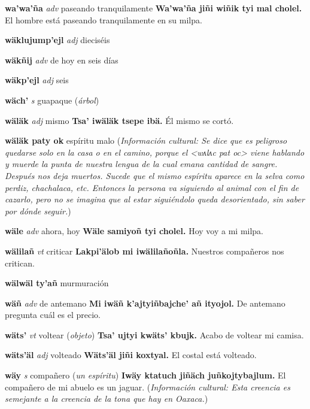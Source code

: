 \documentclass[10pt]{scrbook}
\newcommand{\entry}[1]{\textbf{#1}}
\newcommand{\partofspeech}[1]{\textit{#1}}
\newcommand{\spanishtranslation}[1]{#1}
\newcommand{\clarification}[1]{(\textit{#1})}
\newcommand{\cholexample}[1]{\textbf{#1}}
\newcommand{\exampletranslation}[1]{#1}
\newcommand{\culturalinformation}[1]{(\textit{#1})}
\begin{document}
\begin{multicols}{2}
\entry{wa'wa'ña}
\partofspeech{adv}
\spanishtranslation{paseando tranquilamente}
\cholexample{Wa'wa'ña jiñi wiñik tyi mal cholel.}
\exampletranslation{El hombre está paseando tranquilamente en su milpa.}

\entry{wäklujump'ejl}
\partofspeech{adj}
\spanishtranslation{dieciséis}

\entry{wäkñij}
\partofspeech{adv}
\spanishtranslation{de hoy en seis días}

\entry{wäkp'ejl}
\partofspeech{adj}
\spanishtranslation{seis}

\entry{wäch'}
\partofspeech{s}
\spanishtranslation{guapaque}
\clarification{árbol}

\entry{wäläk}
\partofspeech{adj}
\spanishtranslation{mismo}
\cholexample{Tsa' iwäläk tsepe ibä.}
\exampletranslation{Él mismo se cortó.}

\entry{wäläk paty ok}
\spanishtranslation{espíritu malo}
\culturalinformation{Información cultural: Se dice que es peligroso quedarse solo en la casa o en el camino, porque el <wʌlʌc pat oc> viene hablando y muerde la punta de nuestra lengua de la cual emana cantidad de sangre. Después nos deja muertos. Sucede que el mismo espíritu aparece en la selva como perdiz, chachalaca, etc. Entonces la persona va siguiendo al animal con el fin de cazarlo, pero no se imagina que al estar siguiéndolo queda desorientado, sin saber por dónde seguir.}

\entry{wäle}
\partofspeech{adv}
\spanishtranslation{ahora, hoy}
\cholexample{Wäle samiyoñ tyi cholel.}
\exampletranslation{Hoy voy a mi milpa.}

\entry{wälilañ}
\partofspeech{vt}
\spanishtranslation{criticar}
\cholexample{Lakpi'älob mi iwälilañoñla.}
\exampletranslation{Nuestros compañeros nos critican.}

\entry{wälwäl ty'añ}
\spanishtranslation{murmuración}

\entry{wäñ}
\partofspeech{adv}
\spanishtranslation{de antemano}
\cholexample{Mi iwäñ k'ajtyiñbajche' añ ityojol.}
\exampletranslation{De antemano pregunta cuál es el precio.}

\entry{wäts'}
\partofspeech{vt}
\spanishtranslation{voltear}
\clarification{objeto}
\cholexample{Tsa' ujtyi kwäts' kbujk.}
\exampletranslation{Acabo de voltear mi camisa.}

\entry{wäts'äl}
\partofspeech{adj}
\spanishtranslation{volteado}
\cholexample{Wäts'äl jiñi koxtyal.}
\exampletranslation{El costal está volteado.}

\entry{wäy}
\partofspeech{s}
\spanishtranslation{compañero}
\clarification{un espíritu}
\cholexample{Iwäy ktatuch jiñäch juñkojtybajlum.}
\exampletranslation{El compañero de mi abuelo es un jaguar.}
\culturalinformation{Información cultural: Esta creencia es semejante a la creencia de la tona que hay en Oaxaca.}


\end{multicols}
\end{document}
